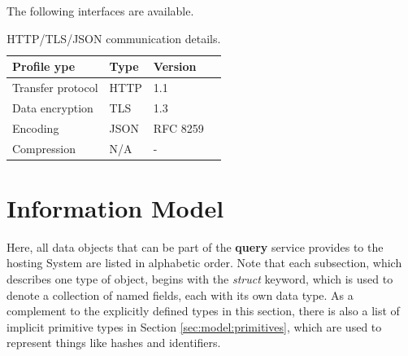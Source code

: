 \documentclass[a4paper]{arrowhead}
\begin{document}
The following interfaces are available.


\begin{table}[ht!]
  \centering
  \begin{tabular}{|l|l|l|l|}
    \rowcolor{gray!33} Profile ype & Type & Version \\ \hline
    Transfer protocol & HTTP & 1.1 \\ \hline
    Data encryption & TLS & 1.3 \\ \hline
    Encoding & JSON & RFC 8259 \cite{rfc8259} \\ \hline
    Compression & N/A & - \\ \hline
  \end{tabular}
  \caption{HTTP/TLS/JSON communication details.}
  \label{tab:comunication_semantics_profile}
\end{table}

\clearpage

\section{Information Model}
\label{sec:model}

Here, all data objects that can be part of the \textbf{query} service
provides to the hosting System are listed in alphabetic order.
Note that each subsection, which describes one type of object, begins with the \textit{struct} keyword, which is used to denote a collection of named fields, each with its own data type.
As a complement to the explicitly defined types in this section, there is also a list of implicit primitive types in Section \ref{sec:model:primitives}, which are used to represent things like hashes and identifiers.

\end{document}
